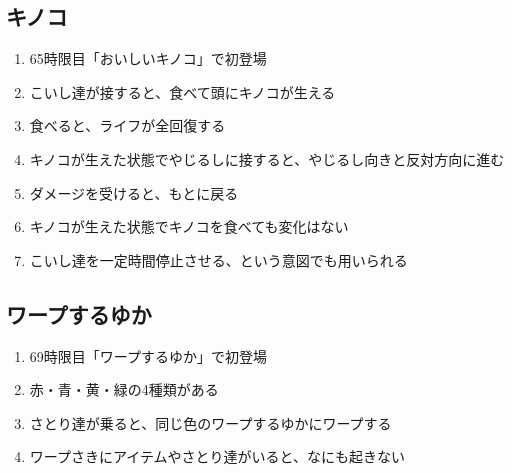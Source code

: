 \clearpage
\subsection{キノコ}
\begin{enumerate}[label={\sarrow}]
\item 65時限目「おいしいキノコ」で初登場
\item こいし達が接すると、食べて頭にキノコが生える
\item 食べると、ライフが全回復する
\item キノコが生えた状態でやじるしに接すると、やじるし向きと反対方向に進む
\item ダメージを受けると、もとに戻る
\item キノコが生えた状態でキノコを食べても変化はない
\item こいし達を一定時間停止させる、という意図でも用いられる
\end{enumerate}


\subsection{ワープするゆか}
\begin{enumerate}[label={\sarrow}]
\item 69時限目「ワープするゆか」で初登場
\item 赤・青・黄・緑の4種類がある
\item さとり達が乗ると、同じ色のワープするゆかにワープする
\item ワープさきにアイテムやさとり達がいると、なにも起きない
\end{enumerate}


